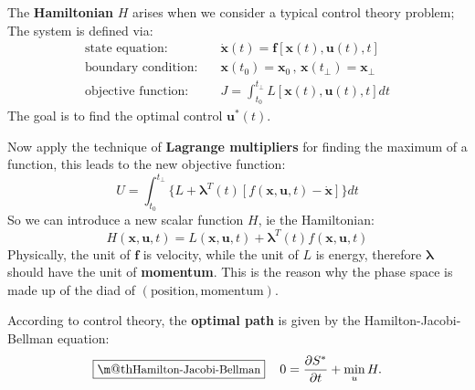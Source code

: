 \documentclass[orivec]{llncs}
\makeatletter
\newcommand{\emp}[1]{\textbf{#1}}
\newcommand{\vect}[1]{\boldsymbol{#1}}
\renewcommand{\boxed}[1]{\fbox{\m@th$\displaystyle\scalebox{0.9}{#1}$} \,}
\makeatother
\begin{document}
The \emp{Hamiltonian} $H$ arises when we consider a typical control theory problem;  The system is defined via:
\begin{eqnarray}
\mbox{state equation:} \quad & \dot{\vect{x}}(t) = \vect{f}[\vect{x}(t), \vect{u}(t), t] \\
\mbox{boundary condition:} \quad & \vect{x}(t_0) = \vect{x}_0 \,,\, \vect{x}(t_\bot) = \vect{x}_\bot \\
\mbox{objective function:} \quad & J = \int_{t_0}^{t_\bot} L[\vect{x}(t), \vect{u}(t), t] dt
\end{eqnarray}
The goal is to find the optimal control $\vect{u}^*(t)$.

Now apply the technique of \emp{Lagrange multipliers} for finding the maximum of a function, this leads to the new objective function:
\begin{equation}
U = \int_{t_0}^{t_\bot} \{ L + \vect{\lambda}^T(t) \left[ f(\vect{x}, \vect{u}, t) - \dot{\vect{x}} \right] \} dt
\end{equation}
So we can introduce a new scalar function $H$, ie the Hamiltonian:
\begin{equation}
H(\vect{x}, \vect{u}, t) = L(\vect{x}, \vect{u}, t) + \vect{\lambda}^T(t) f(\vect{x}, \vect{u}, t)
\end{equation}
Physically, the unit of $\vect{f}$ is velocity, while the unit of $L$ is energy, therefore $\vect{\lambda}$ should have the unit of \emp{momentum}.  This is the reason why the phase space is made up of the diad of $(\mbox{position}, \mbox{momentum})$.


According to control theory, the \textbf{optimal path} is given by the Hamilton-Jacobi-Bellman equation:
\begin{equation}
\boxed{\mbox{Hamilton-Jacobi-Bellman}} \quad
0 = \frac{\partial S^*}{\partial t} + \min_u H .
\end{equation}
\end{document}
